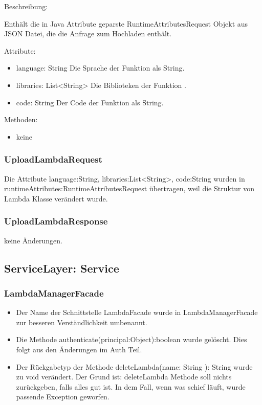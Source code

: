 \documentclass[a4paper,20pt,oneside]{book}
\begin{document}
	\raggedright
	\vspace{0.5cm}
	Beschreibung:
	
	Enthält die in Java Attribute geparste RuntimeAttributesRequest Objekt aus JSON Datei, die die Anfrage zum Hochladen enthält.

	
	\vspace{0.5cm}
	Attribute:
	\begin{itemize}
    \item language: String \linebreak
    Die Sprache der Funktion als String.
    \item libraries: List<String>\linebreak
    Die Biblioteken der Funktion .
    \item code: String \linebreak
    Der Code der Funktion als String.
	\end{itemize}
	
	Methoden:
	\begin{itemize}
	\item keine
	\end{itemize}
	\subsubsection{UploadLambdaRequest}
	Die Attribute language:String, libraries:List<String>, code:String wurden in runtimeAttributes:RuntimeAttributesRequest übertragen, weil die Struktur von Lambda Klasse verändert wurde.
	\subsubsection{UploadLambdaResponse}
	keine Änderungen.
	\subsection{ServiceLayer: Service}
	\subsubsection{LambdaManagerFacade}
	\begin{itemize}
	\item Der Name der Schnittstelle LambdaFacade wurde in LambdaManagerFacade zur besseren Verständlichkeit umbenannt.\linebreak
	\item Die Methode authenticate(principal:Object):boolean wurde gelöscht.  Dies folgt aus den Änderungen im Auth Teil.
 \linebreak
 \item Der Rückgabetyp der Methode  deleteLambda(name: String ): String  wurde zu void verändert. Der Grund ist: deleteLambda Methode soll nichts zurückgeben, falls alles gut ist. In dem Fall, wenn was schief läuft, wurde passende Exception geworfen.
 \linebreak
	 \end{itemize}
\end{document}
